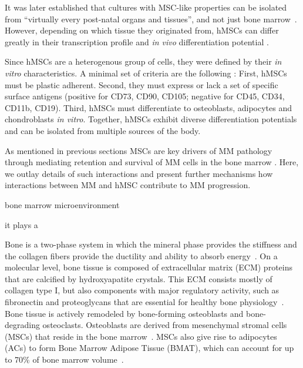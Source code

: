 It was later established that cultures with MSC-like
properties can be isolated from ``virtually every post-natal organs and
tissues'', and not just bone
marrow~\cite{dasilvameirellesMesenchymalStemCells2006}. However, depending on
which tissue they originated from, hMSCs can differ greatly in their
transcription profile and \textit{in vivo} differentiation potential
\cite{jansenFunctionalDifferencesMesenchymal2010,sacchettiNoIdenticalMesenchymal2016}.

Since hMSCs are a heterogenous group of cells, they were defined by their
\textit{in vitro} characteristics. A minimal set of criteria are the following
\cite{dominiciMinimalCriteriaDefining2006}: First, hMSCs must be plastic
adherent. Second, they must express or lack a set of specific surface antigens
(positive for CD73, CD90, CD105; negative for CD45, CD34, CD11b, CD19). Third,
hMSCs must differentiate to osteoblasts, adipocytes and chondroblasts \textit{in
    vitro}. Together, hMSCs exhibit diverse differentiation potentials and can be
isolated from multiple sources of the body. 




\label{sec:intro_myeloma_hMSC}
As mentioned in previous sections MSCs are key drivers of MM pathology through
mediating retention and survival of MM cells in the bone marrow
\cite{mangoliniBoneMarrowStromal2020}. Here, we outlay details of such
interactions and present further mechanisms how interactions between MM and hMSC
contribute to MM progression.

bone marrow microenvironment



it plays a



Bone is a two-phase system in which the mineral phase provides the stiffness and
the collagen fibers provide the ductility and ability to absorb
energy~\cite{viguet-carrinRoleCollagenBone2006}. On a molecular level, bone
tissue is composed of extracellular matrix (ECM) proteins that are calcified by
hydroxyapatite crystals. This ECM consists mostly of collagen type I, but also
components with major regulatory activity, such as fibronectin and proteoglycans
that are essential for healthy bone
physiology~\cite{alcorta-sevillanoDecipheringRelevanceBone2020}. Bone tissue is
actively remodeled by bone-forming osteoblasts and bone-degrading osteoclasts.
Osteoblasts are derived from mesenchymal stromal cells (MSCs) that reside in the
bone marrow~\cite{friedensteinOsteogenesisTransplantsBone1966,
    pittengerMultilineagePotentialAdult1999}. MSCs also give rise to adipocytes
(ACs) to form Bone Marrow Adipose Tissue (BMAT), which can account for up to
70\% of bone marrow volume~\cite{fazeliMarrowFatBone2013}.

